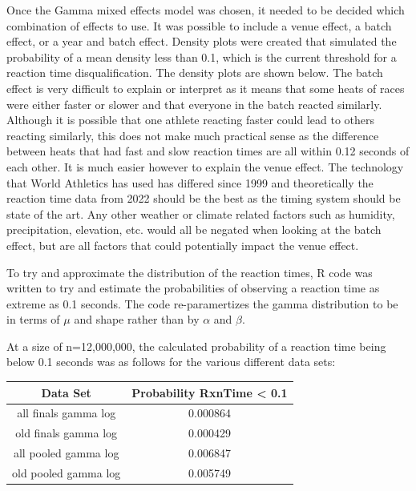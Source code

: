 \documentclass[12pt, letterpaper, titlepage]{article}
\begin{document}



Once the Gamma mixed effects model was chosen, it needed to be decided which combination
of effects to use.  It was possible to include a venue effect, a batch effect, or a year
and batch effect.  Density plots were created that simulated the probability of a mean
density less than 0.1, which is the current threshold for a reaction time
disqualification.  The density plots are shown below.  The batch effect is very
difficult to explain or interpret as it means that some heats of races were either
faster or slower and that everyone in the batch reacted similarly.  Although
it is possible that one athlete reacting faster could lead to others reacting
similarly, this does not make much practical sense as the difference between
heats that had fast and slow reaction times are all within 0.12 seconds of each
other.  It is much easier however to explain the venue effect.  The technology
that World Athletics has used has differed since 1999 and theoretically the
reaction time data from 2022 should be the best as the timing system should be
state of the art.  Any other weather or climate related factors such as humidity,
precipitation, elevation, etc. would all be negated when looking at the batch
effect, but are all factors that could potentially impact the venue effect.  


To try and approximate the distribution of the reaction times, R code was written
to try and estimate the probabilities of observing a reaction time as extreme as
0.1 seconds.  The code re-paramertizes the gamma distribution to be in terms of
$\mu$ and shape rather than by $\alpha$ and $\beta$.

At a size of n=12,000,000, the calculated probability of a reaction
time being below 0.1 seconds was as follows for the various different data sets:

\begin{center}
  \begin{tabular}{|c c|} 
   \hline
   Data Set & Probability RxnTime < 0.1 \\ 
   \hline\hline
   all finals gamma log & 0.000864 \\ 
   \hline
   old finals gamma log & 0.000429 \\
   \hline
   all pooled gamma log & 0.006847 \\
   \hline
   old pooled gamma log & 0.005749 \\
  \end{tabular}
  \end{center}
\end{document}
